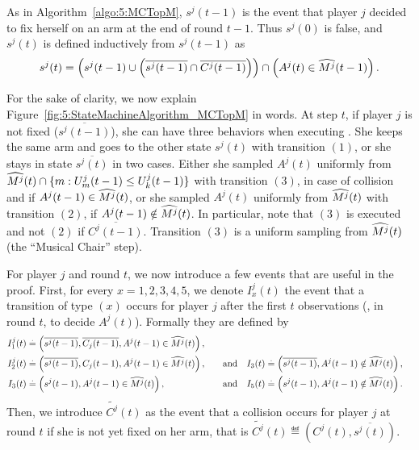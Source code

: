 \begin{smallproof}

  As in Algorithm~\ref{algo:5:MCTopM}, $s^j(t-1)$ is the event that player $j$ decided to fix herself on an arm at the end of round $t-1$.
  Thus $s^j(0)$ is false, and $s^j(t)$ is defined inductively from $s^j(t-1)$ as
  \begin{equation}
      s^j(t) =
      \left( s^j(t-1) \cup \left( \overline{s^j(t-1)} \cap \overline{C^j(t-1)} \right) \right)
      \cap \left( A^j(t) \in \widehat{M^j}(t-1) \right).
  \end{equation}

  For the sake of clarity, we now explain Figure~\ref{fig:5:StateMachineAlgorithm_MCTopM} in words. At step $t$, if player $j$ is not fixed ($\overline{s^j(t-1)}$), she can have three behaviors when executing \MCTopM.
  She keeps the same arm and goes to the other state $s^j(t)$ with transition $(1)$,
  or she stays in state $\overline{s^j(t)}$
  in two cases.
  Either she sampled $A^j(t)$ uniformly
  from $\widehat{M^j}(t) \cap \{ m : U_m^j(t-1) \leq U_k^j(t-1) \}$
  with transition $(3)$,
  in case of collision and if $A^j(t-1) \in \widehat{M^j}(t)$,
  or she sampled $A^j(t)$ uniformly
  from $\widehat{M^j}(t)$ with transition $(2)$,
  if $A^j(t-1) \notin \widehat{M^j}(t)$.
  In particular, note that $(3)$ is executed and not $(2)$ if $\overline{C^j(t-1)}$.
  Transition $(3)$ is a uniform sampling from $\widehat{M^j}(t)$ (the ``Musical Chair'' step).


  For player $j$ and round $t$, we now introduce a few events that are useful in the proof. First, for every $x=1,2,3,4,5$, we denote $I_x^j(t)$ the event that a transition of type $(x)$ occurs for player $j$ after the first $t$ observations (\ie, in round $t$, to decide $A^j(t)$).
  Formally they are defined by
  \begin{align*}
    I_1^j(t) & \overset{.}{=} \left(\overline{s^j(t-1)},\overline{C_j(t-1)}, A^j(t-1) \in \widehat{M^j}(t)\right), \\
    I_2^j(t) & \overset{.}{=} \left(\overline{s^j(t-1)},C_j(t-1), A^j(t-1) \in \widehat{M^j}(t)\right),
    \ \ \ &\text{and} \ \ \
    I_3(t) & \overset{.}{=} \left(\overline{s^j(t-1)},A^j(t-1) \notin \widehat{M^j}(t)\right), \\
    I_3(t) & \overset{.}{=} \left(s^j(t-1),A^j(t-1) \in \widehat{M^j}(t)\right),
    \ \ \ &\text{and} \ \ \
    I_5(t) & \overset{.}{=} \left(s^j(t-1),A^j(t-1) \notin \widehat{M^j}(t)\right).
  \end{align*}
  Then, we introduce $\widetilde{C^j}(t)$ as the event that a collision occurs for player $j$ at round $t$ if she is not yet fixed on her arm, that is
  $\widetilde{C^j}(t) \eqdef \left(C^j(t), \overline{s^j(t)}\right)$.


\end{smallproof}

